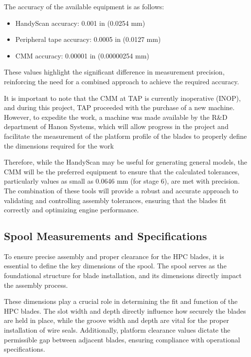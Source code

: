 The accuracy of the available equipment is as follows:  

\begin{itemize}
    \item HandyScan accuracy: 0.001 in (0.0254 mm)
    \item Peripheral tape accuracy: 0.0005 in (0.0127 mm)
    \item CMM accuracy: 0.00001 in (0.00000254 mm)
\end{itemize}

These values highlight the significant difference in measurement precision, reinforcing the need for a combined approach to achieve the required accuracy.

It is important to note that the CMM at TAP is currently inoperative (INOP), and during this project, TAP proceeded with the purchase of a new machine. However, to expedite the work, a machine was made available by the R\&D department of Hanon Systems, which will allow progress in the project and facilitate the measurement of the platform profile of the blades to properly define the dimensions required for the work

Therefore, while the HandyScan may be useful for generating general models, the CMM will be the preferred equipment to ensure that the calculated tolerances, particularly values as small as 0.0646 mm (for stage 6), are met with precision. The combination of these tools will provide a robust and accurate approach to validating and controlling assembly tolerances, ensuring that the blades fit correctly and optimizing engine performance.

\subsection{Spool Measurements and Specifications}
\label{subsec:spool_measurements}

To ensure precise assembly and proper clearance for the HPC blades, it is essential to define the key dimensions of the spool. The spool serves as the foundational structure for blade installation, and its dimensions directly impact the assembly process. 

These dimensions play a crucial role in determining the fit and function of the HPC blades. The slot width and depth directly influence how securely the blades are held in place, while the groove width and depth are vital for the proper installation of wire seals.
Additionally, platform clearance values dictate the permissible gap between adjacent blades, ensuring compliance with operational specifications.

